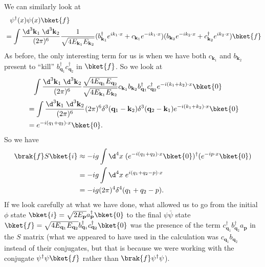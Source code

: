 \documentclass[a4paper]{article}
\begin{document}
We can similarly look at
\begin{align*}
  &\hphantom{=}\psi^\dagger (x) \psi(x) \bket{f} \\
  &= \int \frac{\d^3 \mathbf{k}_1\;\d^3 \mathbf{k}_2}{(2\pi)^6} \frac{1}{\sqrt{4E_{\mathbf{k}_1} E_{\mathbf{k}_2}}}(b^\dagger_{\mathbf{k}_1} e^{ik_1\cdot x} + c_{\mathbf{k}_1} e^{-ik_1\cdot x})(b_{\mathbf{k}_2} e^{-ik_2 \cdot x} + c_{\mathbf{k}_2}^\dagger e^{i k_2 \cdot x})\bket{f}
\end{align*}
As before, the only interesting term for us is when we have both $c_{\mathbf{k}_1}$ and $b_{\mathbf{k}_2}$ present to ``kill'' $b_{\mathbf{q}_1}^\dagger c_{\mathbf{q}_2}^\dagger$ in $\bket{f}$. So we look at
\begin{align*}
  &\hphantom{=} \int \frac{\d^3 \mathbf{k}_1 \; \d^3 \mathbf{k}_2}{(2\pi)^6} \frac{\sqrt{4E_{\mathbf{q}_1}E_{\mathbf{q}_2}}}{\sqrt{4 E_{\mathbf{k}_1} E_{\mathbf{k}_2}}} c_{\mathbf{k}_1} b_{\mathbf{k}_2}b_{\mathbf{q}_1}^\dagger c_{\mathbf{q}_2}^\dagger e^{-i(k_1 + k_2) \cdot x}\bket{0}\\
  &= \int \frac{\d^3 \mathbf{k}_1 \;\d^3 \mathbf{k}_2}{(2\pi)^6} (2\pi)^6 \delta^3(\mathbf{q}_1 - \mathbf{k}_2)\delta^3(\mathbf{q}_2 - \mathbf{k}_1) e^{-i(k_1 + k_2)\cdot x}\bket{0}\\
  &= e^{-i(q_1 + q_2)\cdot x}\bket{0}.
\end{align*}
So we have
\begin{align*}
  \brak{f}S\bket{i} &\approx -ig \int \d^4 x\; (e^{-i(q_1 + q_2) \cdot x}\bket{0})^\dagger (e^{-ip\cdot x}\bket{0})\\
  &= -ig \int \d^4 x\; e^{i(q_1 + q_2 - p) \cdot x}\\
  &= -ig (2\pi)^4 \delta^4(q_1 + q_2 - p).
\end{align*}
If we look carefully at what we have done, what allowed us to go from the initial $\phi$ state $\bket{i} = \sqrt{2 E_\mathbf{p}} a_\mathbf{p}^\dagger\bket{0}$ to the final $\psi\bar\psi$ state $\bket{f} = \sqrt{4 E_{\mathbf{q}_1} E_{\mathbf{q}_2}} b_{\mathbf{q}_1}^\dagger c_{\mathbf{q}_2}^{\dagger} \bket{0}$ was the presence of the term $c_{\mathbf{q}_1}^\dagger b_{\mathbf{q}_2}^\dagger a_\mathbf{p}$ in the $S$ matrix (what we appeared to have used in the calculation was $c_{\mathbf{q}_1} b_{\mathbf{q}_2}$ instead of their conjugates, but that is because we were working with the conjugate $\psi^\dagger \psi \bket{f}$ rather than $\brak{f} \psi^\dagger \psi$).
\end{document}
